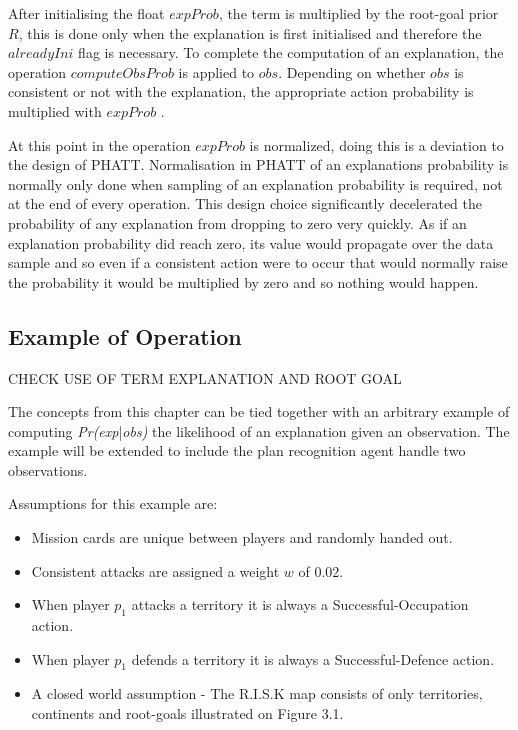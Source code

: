\documentclass[parskip]{cs4rep}
\begin{document}
After initialising the float $expProb$, the term is multiplied by the root-goal prior $R$, this is done only when the explanation is first initialised and therefore the $alreadyIni$ flag is necessary. To complete the computation of an explanation, the operation $computeObsProb$ is applied to $obs$. Depending on whether $obs$ is consistent or not with the explanation, the appropriate action probability is multiplied with $expProb$ .

At this point in the operation $expProb$ is normalized, doing this is a deviation to the design of PHATT. Normalisation in PHATT of an explanations probability is normally only done when sampling of an explanation probability is required, not at the end of every operation. This design choice significantly decelerated the probability of any explanation from dropping to zero very quickly. As if an explanation probability did reach zero, its value would propagate over the data sample and so even if a consistent action were to occur that would normally raise the probability it would be multiplied by zero and so nothing would happen. 

\subsection{Example of Operation}

CHECK USE OF TERM EXPLANATION AND ROOT GOAL

The concepts from this chapter can be tied together with an arbitrary example of computing \textit{Pr(exp}|\textit{obs)} the likelihood of an explanation given an observation. The example will be extended to include the plan recognition agent handle two observations.

Assumptions for this example are:

\begin{itemize}
\item
Mission cards are unique between players and randomly handed out.
\item
Consistent attacks are assigned a weight $w$ of 0.02.
\item
When player $p_1$ attacks a territory it is always a Successful-Occupation action.
\item
When player $p_1$ defends a territory it is always a Successful-Defence action.
\item
A closed world assumption - The R.I.S.K map consists of only territories, continents and root-goals illustrated on Figure 3.1.
\end{itemize}
\end{document}
